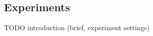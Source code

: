 \subsection{Experiments}
\label{sec:sim-exp} 
TODO introduction (brief, experiment settings) 

 

 

 

 

 


